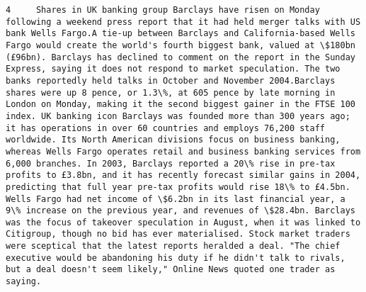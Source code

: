 \documentclass[11pt]{article}
\begin{document}
\begin{Verbatim}[commandchars=\\\{\}]
         4     Shares in UK banking group Barclays have risen on Monday following a weekend press report that it had held merger talks with US bank Wells Fargo.A tie-up between Barclays and California-based Wells Fargo would create the world's fourth biggest bank, valued at \$180bn (£96bn). Barclays has declined to comment on the report in the Sunday Express, saying it does not respond to market speculation. The two banks reportedly held talks in October and November 2004.Barclays shares were up 8 pence, or 1.3\%, at 605 pence by late morning in London on Monday, making it the second biggest gainer in the FTSE 100 index. UK banking icon Barclays was founded more than 300 years ago; it has operations in over 60 countries and employs 76,200 staff worldwide. Its North American divisions focus on business banking, whereas Wells Fargo operates retail and business banking services from 6,000 branches. In 2003, Barclays reported a 20\% rise in pre-tax profits to £3.8bn, and it has recently forecast similar gains in 2004, predicting that full year pre-tax profits would rise 18\% to £4.5bn. Wells Fargo had net income of \$6.2bn in its last financial year, a 9\% increase on the previous year, and revenues of \$28.4bn. Barclays was the focus of takeover speculation in August, when it was linked to Citigroup, though no bid has ever materialised. Stock market traders were sceptical that the latest reports heralded a deal. "The chief executive would be abandoning his duty if he didn't talk to rivals, but a deal doesn't seem likely," Online News quoted one trader as saying.                                                                                                                                                                                                                                                                                                                                                                                                                                                                                                                                                                                                                                                                                                                                                                                                                                                                                                                                                                                                                                                                                                                                                                                                                                                                                                                                                                                                                                                                                                                                                                                                                                                                                                                                                                                 
\end{Verbatim}
\end{document}
